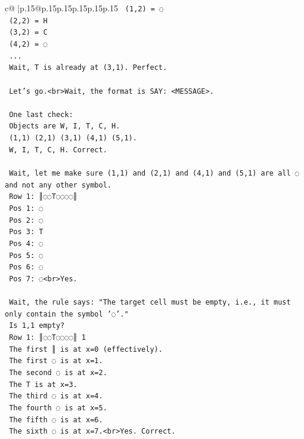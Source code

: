 \documentclass{article}
\begin{document}
{\begin{supertabular}{c@{$\;$}|p{.15\linewidth}@{}p{.15\linewidth}p{.15\linewidth}p{.15\linewidth}p{.15\linewidth}p{.15\linewidth}}
{{{\texttt{    (1,2) = ◌} \\
\texttt{    (2,2) = H} \\
\texttt{    (3,2) = C} \\
\texttt{    (4,2) = ◌} \\
\texttt{    ...} \\
\texttt{    Wait, T is already at (3,1). Perfect.} \\
\\ 
\texttt{    Let's go.<br>Wait, the format is SAY: <MESSAGE>.} \\
\\ 
\texttt{    One last check:} \\
\texttt{    Objects are W, I, T, C, H.} \\
\texttt{    (1,1) (2,1) (3,1) (4,1) (5,1).} \\
\texttt{    W, I, T, C, H. Correct.} \\
\\ 
\texttt{    Wait, let me make sure (1,1) and (2,1) and (4,1) and (5,1) are all ◌ and not any other symbol.} \\
\texttt{    Row 1: ║◌◌T◌◌◌◌║} \\
\texttt{    Pos 1: ◌} \\
\texttt{    Pos 2: ◌} \\
\texttt{    Pos 3: T} \\
\texttt{    Pos 4: ◌} \\
\texttt{    Pos 5: ◌} \\
\texttt{    Pos 6: ◌} \\
\texttt{    Pos 7: ◌<br>Yes.} \\
\\ 
\texttt{    Wait, the rule says: "The target cell must be empty, i.e., it must only contain the symbol '◌'."} \\
\texttt{    Is 1,1 empty?} \\
\texttt{    Row 1: ║◌◌T◌◌◌◌║ 1} \\
\texttt{    The first ║ is at x=0 (effectively).} \\
\texttt{    The first ◌ is at x=1.} \\
\texttt{    The second ◌ is at x=2.} \\
\texttt{    The T is at x=3.} \\
\texttt{    The third ◌ is at x=4.} \\
\texttt{    The fourth ◌ is at x=5.} \\
\texttt{    The fifth ◌ is at x=6.} \\
\texttt{    The sixth ◌ is at x=7.<br>Yes. Correct.} \\
}}}
\end{supertabular}}
\end{document}
